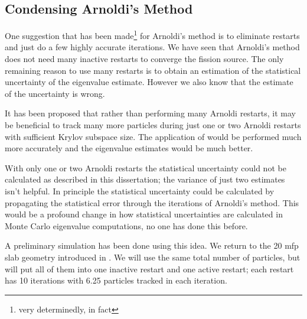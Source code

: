 \subsection{Condensing Arnoldi's Method}
One suggestion that has been made\footnote{very determinedly, in fact} for Arnoldi's method is to eliminate restarts and just do a few highly accurate iterations.  We have seen that Arnoldi's method does not need many inactive restarts to converge the fission source.  The only remaining reason to use many restarts is to obtain an estimation of the statistical uncertainty of the eigenvalue estimate.  However we also know that the estimate of the uncertainty is wrong.

It has been proposed that rather than performing many Arnoldi restarts, it may be beneficial to track many more particles during just one or two Arnoldi restarts with sufficient Krylov subspace size.  The application of \A{} would be performed much more accurately and the eigenvalue estimates would be much better.

With only one or two Arnoldi restarts the statistical uncertainty could not be calculated as described in this dissertation; the variance of just two estimates isn't helpful.  In principle the statistical uncertainty could be calculated by propagating the statistical error through the iterations of Arnoldi's method.  This would be a profound change in how statistical uncertainties are calculated in Monte Carlo eigenvalue computations, no one has done this before.  

A preliminary simulation has been done using this idea.  We return to the 20 mfp slab geometry introduced in .  We will use the same total number of particles, but will put all of them into one inactive restart and one active restart; each restart has 10 iterations with 6.25 particles tracked in each iteration.  

